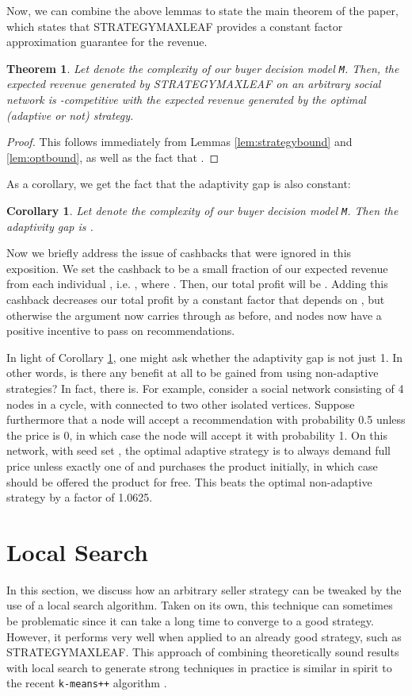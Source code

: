 \documentclass[letterpaper,twoside]{article}
\newtheorem{theorem}{Theorem}
\newtheorem{corollary}{Corollary}
\newcommand{\M}{\texttt{M}}
\newcommand{\strategyml}{\textrm{S{\scriptsize TRATEGY}\-M{\scriptsize AX}\-L{\scriptsize EAF}}}
\begin{document}
Now, we can combine the above lemmas to state the main theorem of
the paper, which states that \strategyml{} provides a constant factor
approximation guarantee for the revenue.
\begin{theorem} \label{thm:approx}
  Let  denote the complexity of our buyer decision model \M.
  Then, the expected revenue generated by \strategyml{} on an
  arbitrary social network is -competitive with the expected
  revenue generated by the optimal (adaptive or not) strategy.
\end{theorem}
\begin{proof}
  This follows immediately from Lemmas \ref{lem:strategybound} and
  \ref{lem:optbound}, as well as the fact that .
\end{proof}
As a corollary, we get the fact that the adaptivity gap is also constant:
\begin{corollary} \label{adaptGap}
  Let  denote the complexity of our buyer decision model \M. Then
  the adaptivity gap is .
\end{corollary}

Now we briefly address the issue of cashbacks that were ignored in this
exposition. We set the cashback  to be a small fraction of our expected revenue
from each individual , i.e. , where . Then, our total profit
will be . Adding this cashback decreases our total profit by a constant
factor that depends on , but otherwise the argument now carries through as
before, and nodes now have a positive incentive to pass on recommendations.

In light of Corollary \ref{adaptGap}, one might ask whether the adaptivity gap
is not just 1. In other words, is there any benefit at all to be gained from using non-adaptive
strategies? In fact, there is. For example, consider a social network consisting of 4
nodes  in a cycle, with  connected to two other
isolated vertices. Suppose furthermore that a node will accept a recommendation with
probability 0.5 unless the price is 0, in which case the node will accept it
with probability 1. On this network, with seed set ,
the optimal adaptive strategy is to always demand full price unless exactly one
of  and  purchases the product initially, in which case  should be
offered the product for free. This beats the optimal non-adaptive strategy by a 
factor of 1.0625.

\section{Local Search} \label{sec:localsearch}
In this section, we discuss how an arbitrary seller strategy can be tweaked
by the use of a local search algorithm. Taken on its own, this technique can
sometimes be problematic since it can take a long time to converge to a good
strategy. However, it performs very well when applied to an already good
strategy, such as \strategyml. This approach of combining theoretically sound
results with local search to generate strong techniques in practice is similar
in spirit to the recent \texttt{k-means++} algorithm \cite{AV07}.
\end{document}

